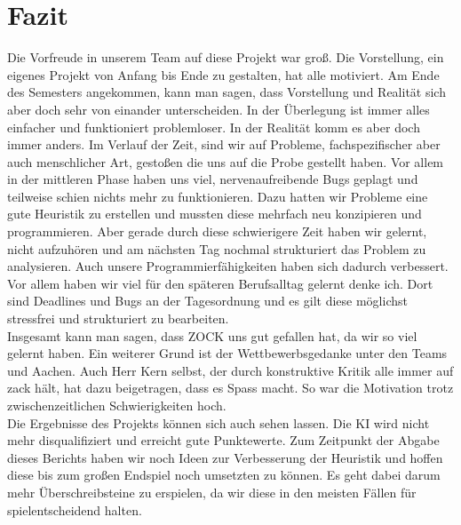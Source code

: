 \documentclass[12pt,a4paper,bibliography=totocnumbered,listof=totocnumbered]{scrartcl}
\begin{document}
    \section{Fazit}
    \vspace{1em}
	Die Vorfreude in unserem Team auf diese Projekt war groß. Die Vorstellung, ein eigenes Projekt von Anfang bis Ende zu gestalten, hat alle motiviert. Am Ende des Semesters angekommen, kann man sagen, dass Vorstellung und Realität sich aber doch sehr von einander unterscheiden. In der Überlegung ist immer alles einfacher und funktioniert problemloser. In der Realität komm es aber doch immer anders. Im Verlauf der Zeit, sind wir auf Probleme, fachspezifischer aber auch menschlicher Art, gestoßen die uns auf die Probe gestellt haben. Vor allem in der mittleren Phase haben uns viel, nervenaufreibende Bugs geplagt und teilweise schien nichts mehr zu funktionieren. Dazu hatten wir Probleme eine gute Heuristik zu erstellen und mussten diese mehrfach neu konzipieren und programmieren. Aber gerade durch diese schwierigere Zeit haben wir gelernt, nicht aufzuhören und am nächsten Tag nochmal strukturiert das Problem zu analysieren. Auch unsere Programmierfähigkeiten haben sich dadurch verbessert. Vor allem haben wir viel für den späteren Berufsalltag gelernt denke ich. Dort sind Deadlines und Bugs an der Tagesordnung und es gilt diese möglichst stressfrei und strukturiert zu bearbeiten.\\
	Insgesamt kann man sagen, dass \grqq ZOCK\glqq{} uns gut gefallen hat, da wir so viel gelernt haben. Ein weiterer Grund ist der Wettbewerbsgedanke unter den Teams und Aachen. Auch Herr Kern selbst, der durch konstruktive Kritik alle immer \glqq auf zack\grqq{} hält, hat dazu beigetragen, dass es Spass macht. So war die Motivation trotz zwischenzeitlichen Schwierigkeiten hoch.\\
	Die Ergebnisse des Projekts können sich auch sehen lassen. Die KI wird nicht mehr disqualifiziert und erreicht gute Punktewerte. Zum Zeitpunkt der Abgabe dieses Berichts haben wir noch Ideen zur Verbesserung der Heuristik und hoffen diese bis zum großen Endspiel noch umsetzten zu können. Es geht dabei darum mehr Überschreibsteine zu erspielen, da wir diese in den meisten Fällen für spielentscheidend halten.\\
\end{document}
